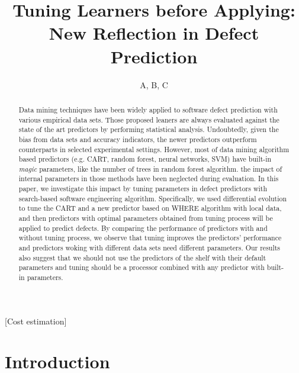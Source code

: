 \documentclass{acm_proc_article-sp}
\begin{document}
\title{Tuning Learners before Applying: New Reflection in Defect Prediction }
\author{ A, B, C}
\maketitle
\begin{abstract}
Data mining techniques have been widely applied to software defect prediction with various 
empirical data sets. Those proposed leaners are always evaluated against the state of the art 
predictors by performing statistical analysis. Undoubtedly, given the bias from data sets and 
accuracy indicators, the newer predictors outperform counterparts in selected experimental 
settings. However,  most of data mining algorithm based predictors (e.g. CART, random 
forest, 
neural networks, SVM) have built-in {\it magic} parameters, like the number of trees in random 
forest algorithm. the impact of internal parameters in those methods have been neglected 
during evaluation. In this paper, we investigate this impact by tuning parameters in defect 
predictors with search-based software engineering algorithm. Specifically, we used differential 
evolution to tune the CART and a new predictor based on WHERE algorithm with local data, 
and then predictors with optimal parameters obtained from tuning process will be applied to 
predict defects. By comparing the performance of predictors with and without tuning process,  
we observe that tuning improves the predictors' performance and predictors woking with 
different data sets need different parameters. Our results also suggest that we should not use 
the predictors of the shelf with their default parameters and tuning should be a processor 
combined with any predictor with built-in parameters.



\end{abstract}

[Cost estimation]



\section{Introduction}
\end{document}
